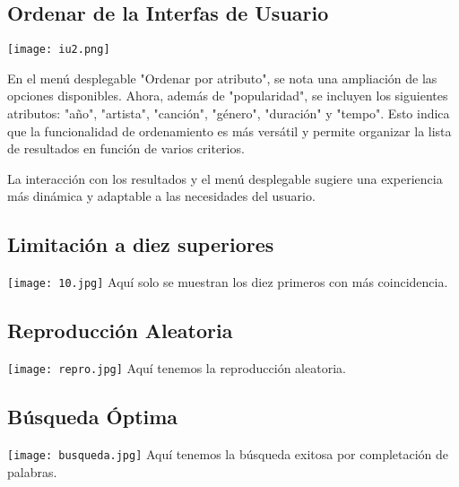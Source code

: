 \documentclass[corference]{IEEEtran}
\begin{document}
\begin{flushleft}
        \subsection{Ordenar de la Interfas de Usuario}
            \texttt{[image: iu2.png]}
            
            \noindent\hspace*{4em}En el menú desplegable "Ordenar por atributo", se nota una ampliación de las opciones disponibles. Ahora, además de "popularidad", se incluyen los siguientes atributos: "año", "artista", "canción", "género", "duración" y "tempo". Esto indica que la funcionalidad de ordenamiento es más versátil y permite organizar la lista de resultados en función de varios criterios.
            
            \noindent\hspace*{4em}La interacción con los resultados y el menú desplegable sugiere una experiencia más dinámica y adaptable a las necesidades del usuario.

        \subsection{Limitación a diez superiores}
            \texttt{[image: 10.jpg]}
            \noindent\hspace*{4em}Aquí solo se muestran los diez primeros con más coincidencia. 
        \subsection{Reproducción Aleatoria}
            \texttt{[image: repro.jpg]}
            \noindent\hspace*{4em}Aquí tenemos la reproducción aleatoria. 
        \subsection{Búsqueda Óptima}
            \texttt{[image: busqueda.jpg]}
            \noindent\hspace*{4em}Aquí tenemos la búsqueda exitosa por completación de palabras. 
    \end{flushleft}
    
\end{document}
